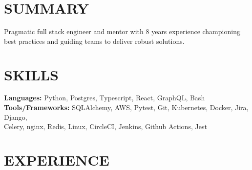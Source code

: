 \documentclass[]{resume}
\begin{document}
\begin{resume}
\setlength{\sectionskip}{1.30em}
\section{SUMMARY\makebox[387 px]{\rule[.5 ex]{387 px}{1.0pt}}}
Pragmatic full stack engineer and mentor with 8 years experience championing best practices and guiding teams to deliver robust solutions. 
\section{SKILLS\makebox[416 px]{\rule[.5 ex]{416 px}{1.0pt}}}
\vspace{0.9mm}
\textbf{Languages:} \hspace*{11.5mm}
Python, Postgres, Typescript, React, GraphQL, Bash \\
% 
\textbf{Tools/Frameworks:} SQLAlchemy, AWS, Pytest, Git, Kubernetes, Docker, Jira, Django, \\
\hspace*{32mm}Celery, nginx, Redis, Linux, CircleCI, Jenkins, Github Actions, Jest
\section{EXPERIENCE\makebox[372 px]{\rule[.5 ex]{372 px}{1.0pt}}}


\end{resume}
\end{document}
